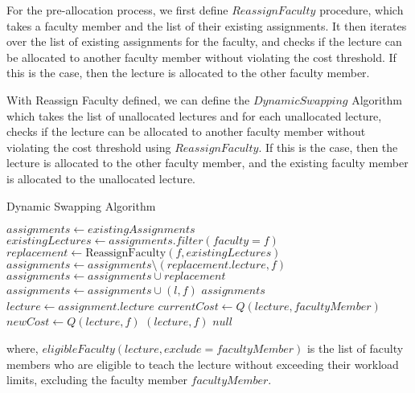 For the pre-allocation process, we first define $ReassignFaculty$ procedure, which takes a faculty member and the list of their existing assignments. It then iterates over the list of existing assignments for the faculty, and checks if the lecture can be allocated to another faculty member without violating the cost threshold. If this is the case, then the lecture is allocated to the other faculty member.

With Reassign Faculty defined, we can define the $DynamicSwapping$ Algorithm which takes the list of unallocated lectures and for each unallocated lecture, checks if the lecture can be allocated to another faculty member without violating the cost threshold using $ReassignFaculty$. If this is the case, then the lecture is allocated to the other faculty member, and the existing faculty member is allocated to the unallocated lecture.

\begin{algorithm}[H]
  \caption{Dynamic Swapping Algorithm}
  \begin{algorithmic}[1]
    \State $assignments \gets existingAssignments$
    \State $existingLectures \gets assignments.filter(faculty=f)$
    \State $replacement \gets \text{ReassignFaculty}(f, existingLectures)$
    \State $assignments \gets assignments \setminus (replacement.lecture, f)$
    \State $assignments \gets assignments \cup replacement$
    \State $assignments \gets assignments \cup (l, f)$
    \EndIf
    \EndFor
    \EndFor
    \State \Return $assignments$
    \EndProcedure
    \\
    \State $lecture \gets assignment.lecture$
    \State $currentCost \gets Q(lecture, facultyMember)$
    \State $newCost \gets Q(lecture, f)$
    \Return $(lecture, f)$
    \EndIf
    \EndFor
    \EndFor
    \State \Return $null$
    \EndProcedure
  \end{algorithmic}
  \label{alg:post_allocation}
\end{algorithm}

where, $eligibleFaculty(lecture, exclude=facultyMember)$ is the list of faculty members who are eligible to teach the lecture without exceeding their workload limits, excluding the faculty member $facultyMember$.

